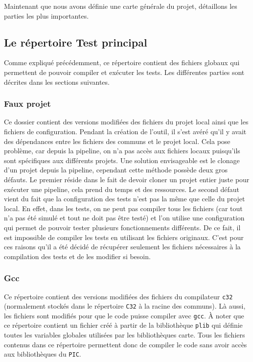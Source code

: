 \documentclass[a4paper]{article}
\begin{document}
Maintenant que nous avons définie une carte générale du projet, détaillons les
parties les plus importantes.

\subsection{Le répertoire Test principal}

Comme expliqué précédemment, ce répertoire contient des fichiers globaux
qui permettent de pouvoir compiler et exécuter les tests. Les différentes
parties sont décrites dans les sections suivantes.

\subsubsection*{Faux projet} %
\label{fakeproj}

Ce dossier contient des versions modifiées des fichiers du projet local ainsi
que les fichiers de configuration. Pendant la création de l'outil, il s'est
avéré qu'il y avait des dépendances entre les fichiers des communs et le projet
local. Cela pose problème, car depuis la pipeline, on n'a pas accès aux fichiers
locaux puisqu'ils sont spécifiques aux différents projets. Une solution
envisageable est le clonage d'un projet depuis la pipeline, cependant cette
méthode possède deux gros défauts. Le premier réside dans le fait de devoir
cloner un projet entier juste pour exécuter une pipeline, cela prend du temps et
des ressources. Le second défaut vient du fait que la configuration des tests
n'est pas la même que celle du projet local. En effet, dans les tests, on ne
peut pas compiler tous les fichiers (car tout n'a pas été simulé et tout ne doit
pas être testé) et l'on utilise une configuration qui permet de pouvoir tester
plusieurs fonctionnements différents. De ce fait, il est impossible de compiler
les tests en utilisant les fichiers originaux. C'est pour ces raisons qu'il a
été décidé de récupérer seulement les fichiers nécessaires à la compilation des
tests et de les modifier si besoin.

\subsubsection*{Gcc}
\label{gcc}

Ce répertoire contient des versions modifiées des fichiers du compilateur
\verb|c32| (normalement stockés dans le répertoire \verb|C32| à la racine des
communs). Là aussi, les fichiers sont modifiés pour que le code puisse compiler
avec \verb|gcc|. À noter que ce répertoire contient un fichier créé à partir de
la bibliothèque \verb|plib| qui définie toutes les variables globales utilisées
par les bibliothèques carte. Tous les fichiers contenus dans ce répertoire
permettent donc de compiler le code sans avoir accès aux bibliothèques du
\verb|PIC|.
\end{document}
